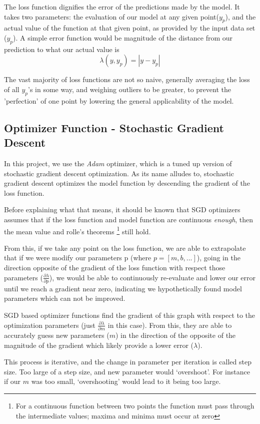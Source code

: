 \documentclass[titlepage,letterpaper]{article}
\begin{document}
The loss function dignifies the error of the predictions made by the model. It takes two parameters: the evaluation of our model at any given point($y_p$), and the actual value of the function at that given point, as provided by the input data set ($y_p$). A simple error function would be magnitude of the distance from our prediction to what our actual value is
\[\lambda(y,y_p) =  |y - y_p| \]

The vast majority of loss functions are not so naive, generally averaging the loss of all $y_p$'s in some way, and weighing outliers to be greater, to prevent the 'perfection' of one point by lowering the general applicability of the model.

\subsection{Optimizer Function - Stochastic Gradient Descent}

In this project, we use the \textit{Adam} optimizer, which is a tuned up version of stochastic gradient descent optimization. As its name alludes to, stochastic gradient descent optimizes the model function by descending the gradient of the loss function. 

Before explaining what that means, it should be known that SGD optimizers assumes that if the loss function and model function are continuous \textit{enough}, then the mean value and rolle’s theorems \footnote{For a continuous function between two points the function must pass through the intermediate values; maxima and minima must occur at zero} still hold. 

From this, if we take any point on the loss function, we are able to extrapolate that if we were modify our parameters p (where $p = [m, b,...]$), going in the direction opposite of the gradient of the loss function with respect those parameters ($\frac{\partial\lambda}{\partial p}$), we would be able to continuously re-evaluate and lower our error until we reach a gradient near zero, indicating we hypothetically found model parameters which can not be improved.

SGD based optimizer functions find the gradient of this graph with respect to the optimization parameters (just $\frac{\partial\lambda}{\partial m}$ in this case). From this, they are able to accurately guess new parameters ($m$) in the direction of the opposite of the magnitude of the gradient which likely provide a lower error ($\lambda$). 

This process is iterative, and the change in parameter per iteration is called step size. Too large of a step size, and new parameter would `overshoot'. For instance if our $m$ was too small, `overshooting' would lead to it being too large.
\end{document}
